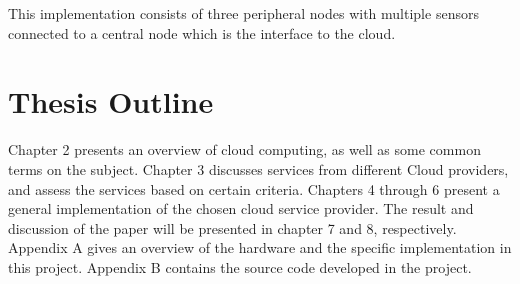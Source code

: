 This implementation consists of three peripheral nodes with multiple sensors connected to a central node which is the interface to the cloud.




\section{Thesis Outline}
Chapter 2 presents an overview of cloud computing, as well as some common terms on the subject. Chapter 3 discusses services from different Cloud providers, and assess the services based on certain criteria. Chapters 4 through 6 present a general implementation of the chosen cloud service provider. The result and discussion of the paper will be presented in chapter 7 and 8, respectively. Appendix A gives an overview of the hardware and the specific implementation in this project. Appendix B contains the source code developed in the project. 


